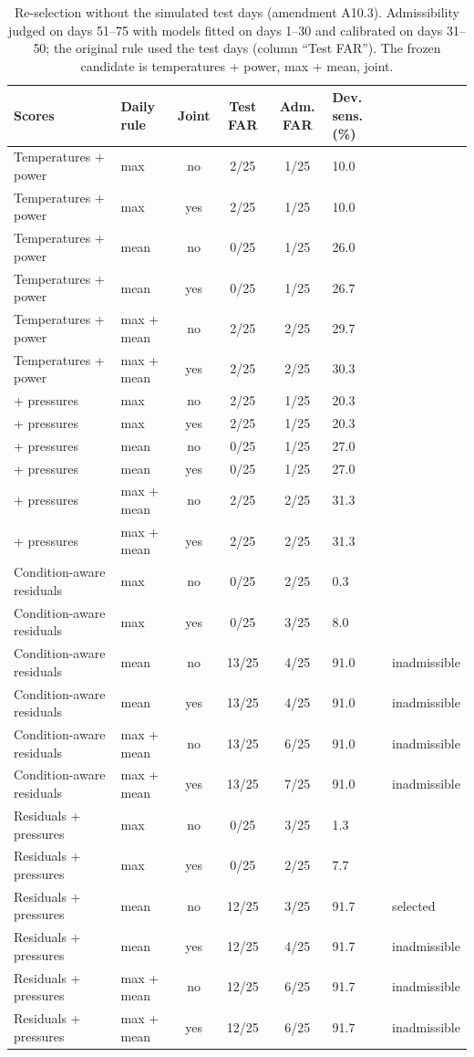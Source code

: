 \begin{table}[h!]\centering\footnotesize\caption{Re-selection without the simulated test days (amendment A10.3). Admissibility judged on days 51--75 with models fitted on days 1--30 and calibrated on days 31--50; the original rule used the test days (column ``Test FAR''). The frozen candidate is temperatures + power, max + mean, joint.}\label{tab:S15}
\begin{tabular}{llcccl l}\toprule
Scores & Daily rule & Joint & Test FAR & Adm. FAR & Dev. sens. (\%) & \\\midrule
Temperatures + power & max & no & 2/25 & 1/25 & 10.0 & \\
Temperatures + power & max & yes & 2/25 & 1/25 & 10.0 & \\
Temperatures + power & mean & no & 0/25 & 1/25 & 26.0 & \\
Temperatures + power & mean & yes & 0/25 & 1/25 & 26.7 & \\
Temperatures + power & max + mean & no & 2/25 & 2/25 & 29.7 & \\
Temperatures + power & max + mean & yes & 2/25 & 2/25 & 30.3 & \\
+ pressures & max & no & 2/25 & 1/25 & 20.3 & \\
+ pressures & max & yes & 2/25 & 1/25 & 20.3 & \\
+ pressures & mean & no & 0/25 & 1/25 & 27.0 & \\
+ pressures & mean & yes & 0/25 & 1/25 & 27.0 & \\
+ pressures & max + mean & no & 2/25 & 2/25 & 31.3 & \\
+ pressures & max + mean & yes & 2/25 & 2/25 & 31.3 & \\
Condition-aware residuals & max & no & 0/25 & 2/25 & 0.3 & \\
Condition-aware residuals & max & yes & 0/25 & 3/25 & 8.0 & \\
Condition-aware residuals & mean & no & 13/25 & 4/25 & 91.0 & inadmissible\\
Condition-aware residuals & mean & yes & 13/25 & 4/25 & 91.0 & inadmissible\\
Condition-aware residuals & max + mean & no & 13/25 & 6/25 & 91.0 & inadmissible\\
Condition-aware residuals & max + mean & yes & 13/25 & 7/25 & 91.0 & inadmissible\\
Residuals + pressures & max & no & 0/25 & 3/25 & 1.3 & \\
Residuals + pressures & max & yes & 0/25 & 2/25 & 7.7 & \\
Residuals + pressures & mean & no & 12/25 & 3/25 & 91.7 & selected\\
Residuals + pressures & mean & yes & 12/25 & 4/25 & 91.7 & inadmissible\\
Residuals + pressures & max + mean & no & 12/25 & 6/25 & 91.7 & inadmissible\\
Residuals + pressures & max + mean & yes & 12/25 & 6/25 & 91.7 & inadmissible\\
\bottomrule\end{tabular}\end{table}

